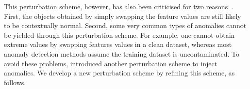 \documentclass[pdflatex,sn-basic]{sn-jnl}%
\theoremstyle{thmstyleone}%
\theoremstyle{thmstyletwo}%
\theoremstyle{thmstylethree}%
\begin{document}

This perturbation scheme, however, has also been criticised for two reasons~\citep{song2007conditional,kuo2018detecting}. 
First, the objects obtained by simply swapping the feature values are still likely to be contextually normal. Second, some very common types of anomalies cannot be yielded through this perturbation scheme. For example, one cannot obtain extreme values by swapping features values in a clean dataset, whereas most anomaly detection methods assume the training dataset is uncontaminated. To avoid these problems, \cite{kuo2018detecting} introduced another perturbation scheme to inject anomalies. We develop a new perturbation scheme by refining this scheme, as follows. 
\end{document}
